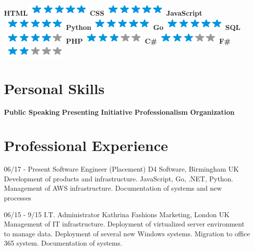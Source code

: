 \documentclass[]{friggeri-cv}
\begin{document}
\begin{aside}
    \textbf{HTML}\includegraphics[scale=0.40]{img/5stars.png}
    \textbf{CSS}\includegraphics[scale=0.40]{img/5stars.png}
    \textbf{JavaScript}\includegraphics[scale=0.40]{img/5stars.png}
    \textbf{Python}\includegraphics[scale=0.40]{img/5stars.png}
    \textbf{Go}\includegraphics[scale=0.40]{img/5stars.png}
     \textbf{SQL}\includegraphics[scale=0.40]{img/4stars.png}
     \textbf{PHP}\includegraphics[scale=0.40]{img/3stars.png}
     \textbf{C\#}\includegraphics[scale=0.40]{img/3stars.png}
     \textbf{F\#}\includegraphics[scale=0.40]{img/2stars.png}
    ~
  \section{Personal Skills}
    \textbf{Public Speaking}
    \textbf{Presenting}
    \textbf{Initiative}
    \textbf{Professionalism}
    \textbf{Organization}
    ~
\end{aside}

\section{Professional Experience}
\begin{entrylist}
  \entry
    {06/17 - Present}
    {Software Engineer (Placement) }
    {D4 Software, Birmingham UK}
    {Development of products and infrastructure.
JavaScript, Go, .NET, Python.
Management of AWS infrastructure.
Documentation of systems and new processes\\}

  \entry
    {06/15 - 9/15}
    {I.T. Administrator}
    {Kathrina Fashions Marketing, London UK}
    {Management of IT infrastructure.
Deployment of virtualized server environment to manage data.
Deployment of several new Windows systems.
Migration to office 365 system.
Documentation of systems.\\}

\end{entrylist}
\end{document}
